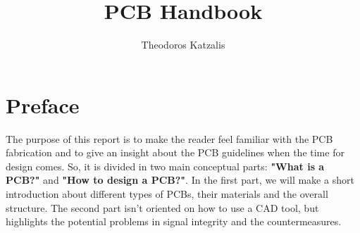 \documentclass[final]{cubedoc}
\title{PCB Handbook}
\author{Theodoros Katzalis}
\begin{document}
	
	\section{Preface}
	
	The purpose of this report is to make the reader feel familiar with the PCB fabrication  and to give an insight about the PCB guidelines when the time for design comes. So, it is divided in two main conceptual parts: \textbf{"What is a PCB?"} and \textbf{"How to design a PCB?"}. In the first part, we will make a short introduction about different types of PCBs, their materials and the overall structure. The second part isn't oriented on how to use a CAD tool, but highlights the potential problems in signal integrity and the countermeasures.
	
	
	
\end{document}
